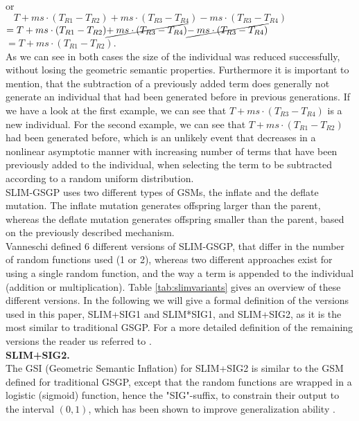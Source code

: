 \documentclass[manuscript, review, anonymous]{acmart} %
\begin{document}
or\\
$\;\;\;T + ms \cdot (T_{R1} - T_{R2}) + ms \cdot (T_{R3} - T_{R4}) - ms \cdot (T_{R3} - T_{R4})$\\
$= T  + ms \cdot (T_{R1} - T_{R2}) \cancel{+\: ms \cdot (T_{R3} - T_{R4})} \cancel{-\: ms \cdot (T_{R3} - T_{R4})}$\\
$= T + ms \cdot (T_{R1} - T_{R2})$.\\
As we can see in both cases the size of
the individual was reduced successfully, without losing the geometric semantic
properties. Furthermore
it is important to mention, that the subtraction of a
previously added term does generally not generate an individual that
had been generated before
in previous generations.
If we have a look at the first example, we
can see that $T + ms \cdot (T_{R3} - T_{R4})$
is a new individual.
For the second example, we can see that $T +
ms \cdot (T_{R1} - T_{R2})$ had been generated before,
which is an unlikely event that decreases in a nonlinear
asymptotic manner with increasing number
of terms that have been previously added to the individual, when selecting the term to be subtracted according to a random uniform distribution.\\
SLIM-GSGP uses two different types of GSMs, the inflate and
the deflate mutation. The inflate mutation generates offspring larger than
the parent,
whereas the deflate mutation generates offspring smaller than the parent, based on the previously described mechanism.\\
Vanneschi \cite{Vanneschi2025} defined 6 different versions of SLIM-GSGP, that differ in
the number of random functions used (1 or 2), whereas two different approaches exist for using a single random function,
and the way a term is appended to the individual (addition or multiplication).
Table \ref{tab:slimvariants} gives an overview of these different versions.
In the following we will give a formal definition of the versions used in this paper, SLIM+SIG1 and SLIM*SIG1, and
SLIM+SIG2, as it is the most similar to traditional GSGP.
For a more detailed definition of the remaining versions the reader us referred to \cite{Vanneschi2025}.\\

\noindent\textbf{SLIM+SIG2.}\\
The GSI (Geometric Semantic Inflation) for SLIM+SIG2 is similar to the GSM defined
for traditional GSGP, except that the random functions are wrapped in a 
logistic (sigmoid) function, hence the "SIG"-suffix, to constrain their output to the interval \((0, 1)\), 
which has been shown to improve generalization ability \cite{Vanneschi2024, general}.
\end{document}
